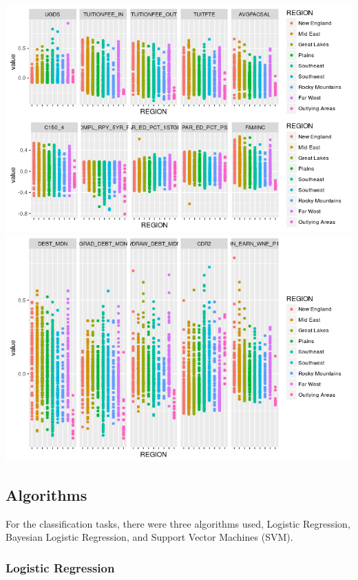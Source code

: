 \documentclass[10pt]{article}
\begin{document}
\includegraphics[width=\textwidth]{figures/region-overview1}
\includegraphics[width=\textwidth]{figures/region-overview2}



    
\subsection{Algorithms}

For the classification tasks, there were three algorithms used, Logistic Regression, Bayesian Logistic Regression, and Support Vector Machines (SVM).

\subsubsection{Logistic Regression}
\end{document}
